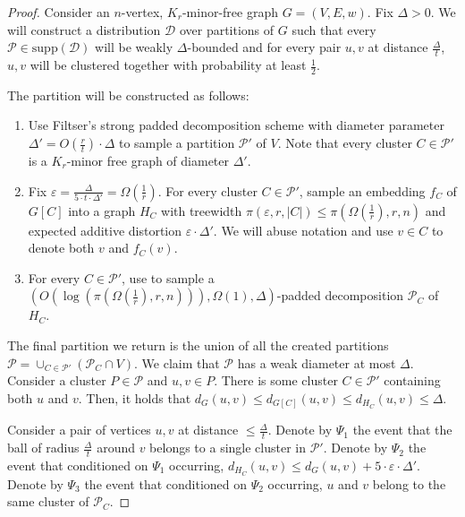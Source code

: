 \documentclass{article}
\newcommand{\supp}{\mathrm{supp}}
\def\cP{\ensuremath{\mathcal{P}}}
\def\eps{\varepsilon}
\begin{document}
\begin{proof}
	Consider an $n$-vertex, $K_r$-minor-free graph $G=\left(V,E,w\right)$. 
	Fix $\Delta>0$. We will construct a distribution $\mathcal{D}$ over partitions of $G$ such that every $\mathcal{P}\in\supp(\mathcal{D})$ will be weakly $\Delta$-bounded and for every pair $u,v$ at distance $\frac{\Delta}{t}$, $u,v$ will be clustered together with probability at least $\frac12$.
	
	The partition will be constructed as follows:
	\begin{enumerate}
		\item Use Filtser's \cite{Fil19Approx} strong padded decomposition scheme with diameter parameter $\Delta'=O(\frac{r}{t})\cdot\Delta$ to sample a partition $\cP'$ of $V$. Note that every cluster $C\in\cP'$ is a $K_r$-minor free graph of diameter $\Delta'$.
		\item Fix $\eps=\frac{\Delta}{5\cdot t\cdot \Delta'}=\Omega(\frac1r)$. For every cluster $C\in\cP'$, sample an embedding $f_C$ of $G[C]$ into a graph $H_C$ with treewidth $\pi(\eps,r,|C|)\le \pi(\Omega(\frac1r),r,n)$ and expected additive distortion $\eps\cdot\Delta'$. We will abuse notation and use $v\in C$ to denote both $v$ and $f_C(v)$.
		\item For every $C\in \cP'$, use  to sample a 
		$\left(O(\log( \pi(\Omega(\frac1r),r,n))),\Omega(1),\Delta\right)$-padded decomposition $\cP_C$ of $H_C$.
	\end{enumerate}
	The final partition we return is the union of all the created partitions $\cP=\cup_{C\in\cP'}(\cP_C\cap V)$. We claim that $\cP$ has a weak diameter at most $\Delta$. Consider a cluster $P\in\cP$ and $u,v\in P$. There is some cluster $C\in\cP'$ containing both $u$ and $v$. Then, it holds that $d_G(u,v)\le  d_{G[C]}(u,v)\le d_{H_C}(u,v)\le\Delta$.
	
	Consider a pair of vertices $u,v$ at distance $\le\frac\Delta t$.  Denote by $\Psi_1$ the event that the ball of radius $\frac\Delta t$
	around $v$ belongs to a single cluster in $\cP'$. Denote by $\Psi_2$ the event that conditioned on $\Psi_1$ occurring, $d_{H_C}(u,v)\le d_{G}(u,v)+5\cdot\eps\cdot\Delta'$. Denote by $\Psi_3$ the event that conditioned on $\Psi_2$ occurring, $u$ and $v$ belong to the same cluster of $\cP_C$.
	

\end{proof}
\end{document}
